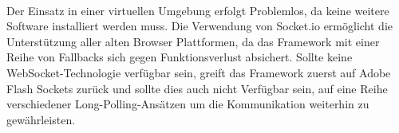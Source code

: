 \\Der Einsatz in einer virtuellen Umgebung erfolgt Problemlos, da keine weitere Software installiert werden muss. Die Verwendung von Socket.io ermöglicht die Unterstützung aller alten Browser Plattformen, da das Framework mit einer Reihe von Fallbacks sich gegen Funktionsverlust absichert. Sollte keine WebSocket-Technologie verfügbar sein, greift das Framework zuerst auf Adobe Flash Sockets zurück und sollte dies auch nicht Verfügbar sein, auf eine Reihe verschiedener Long-Polling-Ansätzen um die Kommunikation weiterhin zu gewährleisten.











